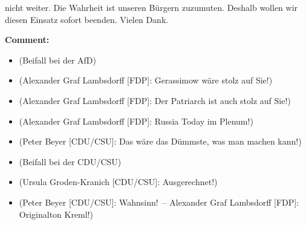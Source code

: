 \documentclass{article}
\begin{document}
nicht weiter. Die Wahrheit ist unseren Bürgern zuzumuten. Deshalb wollen wir diesen Einsatz sofort beenden. Vielen Dank.  

\noindent\textbf{Comment:}
\begin{itemize}
    \setlength\itemsep{-3pt}
    \item (Beifall bei der AfD)
    \setlength\itemsep{-3pt}
    \item (Alexander Graf Lambsdorff [FDP]: Gerassimow wäre stolz auf Sie!)
    \setlength\itemsep{-3pt}
    \item (Alexander Graf Lambsdorff [FDP]: Der Patriarch ist auch stolz auf Sie!)
    \setlength\itemsep{-3pt}
    \item (Alexander Graf Lambsdorff [FDP]: Russia Today im Plenum!)
    \setlength\itemsep{-3pt}
    \item (Peter Beyer [CDU/CSU]: Das wäre das Dümmste, was man machen kann!)
    \setlength\itemsep{-3pt}
    \item (Beifall bei der CDU/CSU)
    \setlength\itemsep{-3pt}
    \item (Ursula Groden-Kranich [CDU/CSU]: Ausgerechnet!)
    \setlength\itemsep{-3pt}
    \item (Peter Beyer [CDU/CSU]: Wahnsinn! – Alexander Graf Lambsdorff [FDP]: Originalton Kreml!)
\end{itemize}
\end{document}
